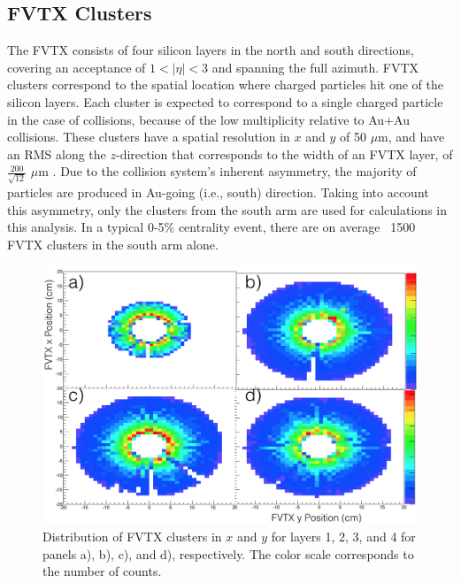 \subsection{FVTX Clusters}
The FVTX consists of four silicon layers in the north and south directions, covering an acceptance of $1 < | \eta | < 3$ and spanning the full azimuth. FVTX clusters correspond to the spatial location where charged particles hit one of the silicon layers. Each cluster is expected to correspond to a single charged particle in the case of \pau collisions, because of the low multiplicity relative to Au+Au collisions. These clusters have a spatial resolution in $x$ and $y$ of 50 $\mu$m, and have an RMS along the $z$-direction that corresponds to the width of an FVTX layer, of $\frac{200}{\sqrt{12}}$ $\mu$m \cite{Aidala201444}. Due to the \pau collision system's inherent asymmetry, the majority of particles are produced in Au-going (i.e., south) direction. Taking into account this asymmetry, only the clusters from the south arm are used for calculations in this analysis. In a typical 0-5$\%$ centrality event, there are on average ~1500 FVTX clusters in the south arm alone.

\begin{figure}[!h]
\begin{center}
\includegraphics[width=0.55\linewidth]{figs/fvtx_clus_xy.png}
\caption{Distribution of FVTX clusters in $x$ and $y$ for layers 1, 2, 3, and 4 for panels a), b), c), and d), respectively. The color scale corresponds to the number of counts.}
\label{fig:dc_mom_res}
\end{center}
\end{figure}

